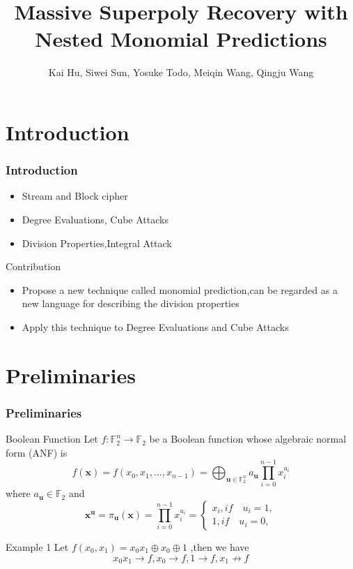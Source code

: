 \documentclass[notheorems, aspectratio=169]{beamer}
\title[Massive Superpoly Recovery with Nested Monomial Predictions]
{Massive Superpoly Recovery with Nested Monomial Predictions}
\author{Kai Hu, Siwei Sun, Yosuke Todo, Meiqin Wang,  Qingju Wang}
\institute[HUST]{ASIACRYPT 2021}
\begin{document}
    \begin{frame}
        \titlepage
    \end{frame}



\section{ Introduction}
\begin{frame}
    \frametitle{Introduction}
    \begin{itemize}
        \item Stream and Block cipher
        \item Degree Evaluations, Cube Attacks
        \item Division Properties,Integral Attack
    \end{itemize}
    \begin{block}{Contribution  }
        \begin{itemize}
         \item Propose a new technique called monomial prediction,can be regarded as a new language for describing the division properties
         \item Apply this technique to Degree Evaluations and Cube Attacks
        \end{itemize}
    \end{block}
\end{frame}

\section{ Preliminaries}
\begin{frame}
    \frametitle{Preliminaries}

    \begin{block}{Boolean Function }
        Let $f: \mathbb{F}^n_2 \rightarrow \mathbb{F}_2$ be a Boolean function whose algebraic normal form (ANF) is 
        $$f(\boldsymbol{x})=f(x_0,x_1,...,x_{n-1})=\bigoplus_{\boldsymbol{u}\in \mathbb{F}_2^n}a_{\boldsymbol{u}} \prod^{n-1}_{i=0}x_i^{u_i}$$
        where $a_\boldsymbol{u}\in \mathbb{F}_2$ and
        $$
        \boldsymbol{x}^{\boldsymbol{u}}=\pi_{\boldsymbol{u}}(\boldsymbol{x})=\prod^{n-1}_{i=0}x_i^{u_i}= \left\{\begin{matrix}x_i,if \quad u_i=1,\\1,if \quad u_i=0, \end{matrix}\right.    
        $$

    \end{block}
    \begin{block}{Example 1}
        Let $f(x_0,x_1) =x_0x_1 \oplus x_0 \oplus 1$ ,then we have  
         $$x_0x_1 \rightarrow f ,x_0 \rightarrow f,1 \rightarrow f ,x_1 \not \rightarrow f$$ 
    \end{block}
\end{frame}
\end{document}
